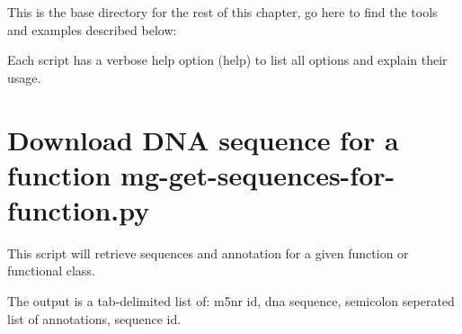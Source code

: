 \documentclass[letterpaper,10pt,english]{sphinxmanual}
\begin{document}
\begin{sphinxVerbatim}[commandchars=\\\{\}]
\end{sphinxVerbatim}

This is the base directory for the rest of this chapter, go here to find
the tools and examples described below:

\begin{sphinxVerbatim}[commandchars=\\\{\}]
\end{sphinxVerbatim}

Each script has a verbose help option (\textendash{}help) to list all options and
explain their usage.


\section{Download DNA sequence for a function \textendash{} mg-get-sequences-for-function.py}
\label{\detokenize{api:download-dna-sequence-for-a-function-mg-get-sequences-for-function-py}}
This script will retrieve sequences and annotation for a given function
or functional class.

The output is a tab-delimited list of: m5nr id, dna sequence, semicolon
seperated list of annotations, sequence id.


\begin{sphinxVerbatim}[commandchars=\\\{\}]
          
\end{sphinxVerbatim}
\end{document}
